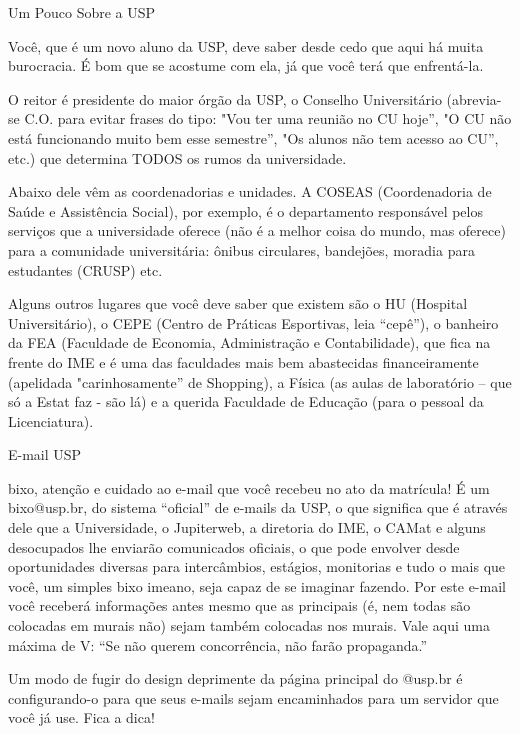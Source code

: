 \begin{secao}{Um Pouco Sobre a USP}

Você, que é um novo aluno da USP, deve saber desde cedo que aqui há muita
burocracia. É bom que se acostume com ela, já que você terá que enfrentá-la. 

O reitor é presidente do maior órgão da USP, o Conselho Universitário (abrevia-se
C.O. para evitar frases do tipo: "Vou ter uma reunião no CU hoje”, "O CU não
está funcionando muito bem esse semestre”, "Os alunos não tem acesso ao CU”,
etc.) que determina TODOS os rumos da universidade.

Abaixo dele vêm as coordenadorias e unidades. A COSEAS (Coordenadoria de Saúde
e Assistência Social), por exemplo, é o departamento responsável pelos serviços
que a universidade oferece (não é a melhor coisa do mundo, mas oferece) para a
comunidade universitária: ônibus circulares, bandejões, moradia para estudantes
(CRUSP) etc.

Alguns outros lugares que você deve saber que existem são o HU (Hospital
Universitário), o CEPE (Centro de Práticas Esportivas, leia “cepê”), o banheiro
da FEA (Faculdade de Economia, Administração e Contabilidade), que fica na
frente do IME e é uma das faculdades mais bem abastecidas financeiramente
(apelidada "carinhosamente” de Shopping), a Física (as aulas de laboratório –
que só a Estat faz - são lá) e a querida Faculdade de Educação (para o pessoal
da Licenciatura).

\begin{subsecao}{E-mail USP}

bixo, atenção e cuidado ao e-mail que você recebeu no ato da matrícula! É um
bixo@usp.br, do sistema “oficial” de e-mails da USP, o que significa que é
através dele que a Universidade, o Jupiterweb, a diretoria do IME, o CAMat e
alguns desocupados lhe enviarão comunicados oficiais, o que pode envolver desde
oportunidades diversas para intercâmbios, estágios, monitorias e tudo o mais que
você, um simples bixo imeano, seja capaz de se imaginar fazendo. Por este e-mail
você receberá informações antes mesmo que as principais (é, nem todas são
colocadas em murais não) sejam também colocadas nos murais. Vale aqui uma máxima
de V: “Se não querem concorrência, não farão propaganda.” 

Um modo de fugir do design deprimente da página principal do @usp.br é
configurando-o para que seus e-mails sejam encaminhados para um servidor que
você já use. Fica a dica! 

\end{subsecao}


\end{secao}
